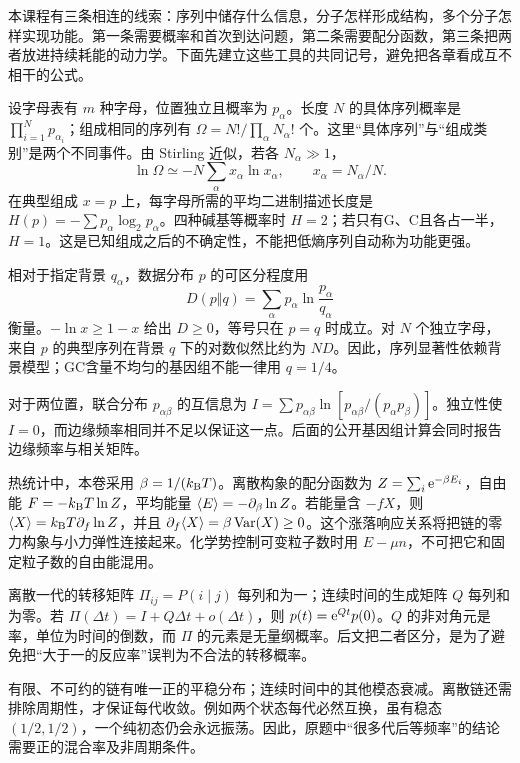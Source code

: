 
本课程有三条相连的线索：序列中储存什么信息，分子怎样形成结构，多个分子怎样实现功能。第一条需要概率和首次到达问题，第二条需要配分函数，第三条把两者放进持续耗能的动力学。下面先建立这些工具的共同记号，避免把各章看成互不相干的公式。

设字母表有 $m$ 种字母，位置独立且概率为 $p_\alpha$。长度 $N$ 的具体序列概率是 $\prod_{i=1}^Np_{\alpha_i}$；组成相同的序列有 $\Omega=N!/\prod_\alpha N_\alpha!$ 个。这里“具体序列”与“组成类别”是两个不同事件。由 Stirling 近似，若各 $N_\alpha\gg1$，
\[
\ln\Omega\simeq-N\sum_\alpha x_\alpha\ln x_\alpha,
\qquad x_\alpha=N_\alpha/N.
\]
在典型组成 $x=p$ 上，每字母所需的平均二进制描述长度是 $H(p)=-\sum p_\alpha\log_2p_\alpha$。四种碱基等概率时 $H=2$；若只有G、C且各占一半，$H=1$。这是已知组成之后的不确定性，不能把低熵序列自动称为功能更强。

相对于指定背景 $q_\alpha$，数据分布 $p$ 的可区分程度用
\[
D(p\Vert q)=\sum_\alpha p_\alpha\ln\frac{p_\alpha}{q_\alpha}
\]
衡量。$-\ln x\ge1-x$ 给出 $D\ge0$，等号只在 $p=q$ 时成立。对 $N$ 个独立字母，来自 $p$ 的典型序列在背景 $q$ 下的对数似然比约为 $ND$。因此，序列显著性依赖背景模型；GC含量不均匀的基因组不能一律用 $q=1/4$。

对于两位置，联合分布 $p_{\alpha\beta}$ 的互信息为 $I=\sum p_{\alpha\beta}\ln[p_{\alpha\beta}/(p_\alpha p_\beta)]$。独立性使 $I=0$，而边缘频率相同并不足以保证这一点。后面的公开基因组计算会同时报告边缘频率与相关矩阵。

热统计中，本卷采用 $\beta=1/(k_{\mathrm B} T)$。离散构象的配分函数为 $Z=\sum_i\mathrm e^{-\beta E_i}$，自由能 $F=-k_{\mathrm B} T\ln Z$，平均能量 $\langle E\rangle=-\partial_\beta\ln Z$。若能量含 $-fX$，则 $\langle X\rangle=k_{\mathrm B} T\partial_f\ln Z$，并且 $\partial_f\langle X\rangle=\beta\operatorname{Var}(X)\ge0$。这个涨落响应关系将把链的零力构象与小力弹性连接起来。化学势控制可变粒子数时用 $E-\mu n$，不可把它和固定粒子数的自由能混用。

离散一代的转移矩阵 $\Pi_{ij}=P(i\mid j)$ 每列和为一；连续时间的生成矩阵 $Q$ 每列和为零。若 $\Pi(\Delta t)=I+Q\Delta t+o(\Delta t)$，则 $p(t)=\mathrm e^{Qt}p(0)$。$Q$ 的非对角元是率，单位为时间的倒数，而 $\Pi$ 的元素是无量纲概率。后文把二者区分，是为了避免把“大于一的反应率”误判为不合法的转移概率。

有限、不可约的链有唯一正的平稳分布；连续时间中的其他模态衰减。离散链还需排除周期性，才保证每代收敛。例如两个状态每代必然互换，虽有稳态 $(1/2,1/2)$，一个纯初态仍会永远振荡。因此，原题中“很多代后等频率”的结论需要正的混合率及非周期条件。

